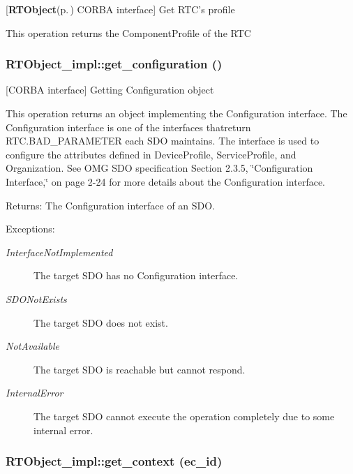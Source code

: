 [{\bf RTObject}{\rm (p.\,\pageref{namespaceRTObject})} CORBA interface] Get RTC's profile 

This operation returns the Component\-Profile of the RTC
\subsubsection{\setlength{\rightskip}{0pt plus 5cm}RTObject\_\-impl::get\_\-configuration ()}\label{classRTObject__impl_RTObject__impla43}


[CORBA interface] Getting Configuration object 

This operation returns an object implementing the Configuration interface. The Configuration interface is one of the interfaces thatreturn RTC.BAD\_\-PARAMETER each SDO maintains. The interface is used to configure the attributes defined in Device\-Profile, Service\-Profile, and Organization. See OMG SDO specification Section 2.3.5, \char`\"{}Configuration Interface,\char`\"{} on page 2-24 for more details about the Configuration interface.

\begin{Desc}
\item[Returns:]The Configuration interface of an SDO. \end{Desc}
\begin{Desc}
\item[Exceptions:]
\begin{description}
\item[{\em Interface\-Not\-Implemented}]The target SDO has no Configuration interface. \item[{\em SDONot\-Exists}]The target SDO does not exist. \item[{\em Not\-Available}]The target SDO is reachable but cannot respond. \item[{\em Internal\-Error}]The target SDO cannot execute the operation completely due to some internal error.\end{description}
\end{Desc}
\subsubsection{\setlength{\rightskip}{0pt plus 5cm}RTObject\_\-impl::get\_\-context (ec\_\-id)}\label{classRTObject__impl_RTObject__impla18}


